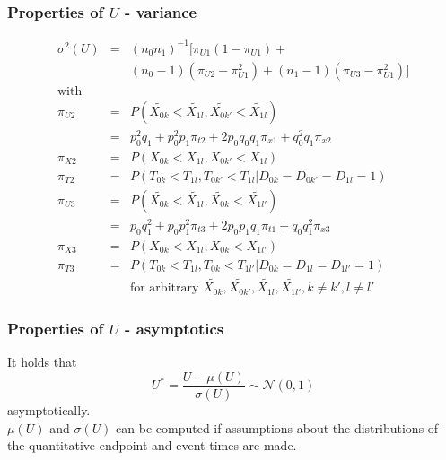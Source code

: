 \documentclass[xcolor=pdftex,dvipsnames,table]{beamer}\usepackage[]{graphicx}\usepackage[]{color}
\begin{document}
\begin{frame}[label = slide7] %
\frametitle{Properties of $U$ - variance}
\begin{eqnarray*}
\sigma^2(U) & = & (n_0 n_1)^{-1} \big[ \pi_{U1} (1 - \pi_{U1}) + \\
            &   &                 (n_0 - 1) (\pi_{U2} - \pi_{U1}^2) + 
                                  (n_1 - 1) (\pi_{U3} - \pi_{U1}^2) \big] \\
  \mbox{with} &   & \\
  \pi_{U2} & = & P(\tilde{X_{0k}} < \tilde{X_{1l}}, \tilde{X_{0k'}} < \tilde{X_{1l}}) \\
           & = & p_0^2 q_1 + p_0^2 p_1 \pi_{t2} + 2 p_0 q_0 q_1 \pi_{x1} + q_0^2 q_1 \pi_{x2} \\
  \pi_{X2} & = & P(X_{0k} < X_{1l}, X_{0k'} < X_{1l}) \\
  \pi_{T2} & = & P(T_{0k} < T_{1l}, T_{0k'} < T_{1l} | D_{0k} = D_{0k'} = D_{1l} = 1) \\
  \pi_{U3} & = & P(\tilde{X_{0k}} < \tilde{X_{1l}}, \tilde{X_{0k}} < \tilde{X_{1l'}}) \\
           & = & p_0 q_1^2 + p_0 p_1^2 \pi_{t3} + 2 p_0 p_1 q_1 \pi_{t1} + q_0 q_1^2 \pi_{x3} \\
  \pi_{X3} & = & P(X_{0k} < X_{1l}, X_{0k} < X_{1l'}) \\
  \pi_{T3} & = & P(T_{0k} < T_{1l}, T_{0k} < T_{1l'} | D_{0k} = D_{1l} = D_{1l'} =1)\\
           &   & \mbox{for arbitrary } \tilde{X_{0k}}, \tilde{X_{0k'}}, \tilde{X_{1l}}, 
                                      \tilde{X_{1l'}}, k \ne k', l \ne l'
\end{eqnarray*}
\end{frame}


\begin{frame}[label = slide8] %
\frametitle{Properties of $U$ - asymptotics}
It holds that
  $$ U^{*} = \frac{U - \mu(U)}{\sigma(U)} \sim \mathcal{N} (0, 1)$$ asymptotically.\\
\vspace{0.5cm}
$\mu(U)$ and $\sigma(U)$ can be computed if assumptions about the distributions of the quantitative endpoint and 
event times are made.
\end{frame}
\end{document}
